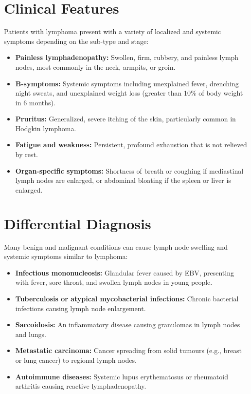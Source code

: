 \section*{Clinical Features}
Patients with lymphoma present with a variety of localized and systemic symptoms depending on the sub-type and stage:

\begin{itemize}
    \item \textbf{Painless lymphadenopathy:} Swollen, firm, rubbery, and painless lymph nodes, most commonly in the neck, armpits, or groin.
    \item \textbf{B-symptoms:} Systemic symptoms including unexplained fever, drenching night sweats, and unexplained weight loss (greater than 10\% of body weight in 6 months).
    \item \textbf{Pruritus:} Generalized, severe itching of the skin, particularly common in Hodgkin lymphoma.
    \item \textbf{Fatigue and weakness:} Persistent, profound exhaustion that is not relieved by rest.
    \item \textbf{Organ-specific symptoms:} Shortness of breath or coughing if mediastinal lymph nodes are enlarged, or abdominal bloating if the spleen or liver is enlarged.
\end{itemize}

\section*{Differential Diagnosis}
Many benign and malignant conditions can cause lymph node swelling and systemic symptoms similar to lymphoma:

\begin{itemize}
    \item \textbf{Infectious mononucleosis:} Glandular fever caused by EBV, presenting with fever, sore throat, and swollen lymph nodes in young people.
    \item \textbf{Tuberculosis or atypical mycobacterial infections:} Chronic bacterial infections causing lymph node enlargement.
    \item \textbf{Sarcoidosis:} An inflammatory disease causing granulomas in lymph nodes and lungs.
    \item \textbf{Metastatic carcinoma:} Cancer spreading from solid tumours (e.g., breast or lung cancer) to regional lymph nodes.
    \item \textbf{Autoimmune diseases:} Systemic lupus erythematosus or rheumatoid arthritis causing reactive lymphadenopathy.
\end{itemize}

